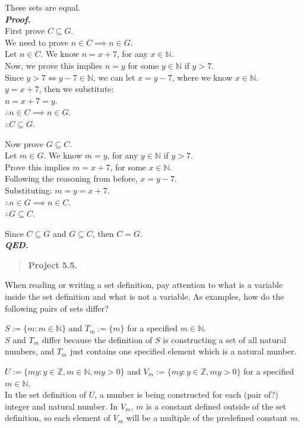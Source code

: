 These sets are equal.\\
\textbf{\emph{Proof.}}\\
First prove \(C\subseteq G\).\\
We need to prove \(n\in C \implies n\in G\).\\
Let \(n\in C\). We know \(n=x+7\), for any \(x\in\mathbb{N}\).\\
Now, we prove this implies \(n=y\) for some \(y\in\mathbb{N}\) if
\(y>7\).\\
Since \(y>7 \iff y-7\in \mathbb{N}\), we can let \(x=y-7\), where we
know \(x\in\mathbb{N}\).\\
\(y=x+7\), then we substitute:\\
\(n=x+7=y\).\\
\(\therefore n\in C \implies n\in G\).\\
\(\therefore C\subseteq G\).

Now prove \(G\subseteq C\).\\
Let \(m\in G\). We know \(m=y\), for any \(y\in\mathbb{N}\) if
\(y>7\).\\
Prove this implies \(m=x+7\), for some \(x\in\mathbb{N}\).\\
Following the reasoning from before, \(x=y-7\).\\
Substituting: \(m=y=x+7\).\\
\(\therefore n\in G \implies n\in C\).\\
\(\therefore G\subseteq C\).

Since \(C \subseteq G\) and \(G \subseteq C\), then \(C=G\).\\
\textbf{\emph{QED.}}

\begin{quote}
\textbf{Project 5.5.}
\end{quote}

When reading or writing a set definition, pay attention to what is a
variable inside the set definition and what is not a variable. As
examples, how do the following pairs of sets differ?

\(S := \{m : m \in \mathbb{N}\}\) and \(T_m := \{m\}\) for a specified
\(m \in \mathbb{N}\).\\
\(S\) and \(T_m\) differ because the definition of \(S\) is constructing
a set of all natural numbers, and \(T_m\) just contains one specified
element which is a natural number.

\(U := \{my : y \in \mathbb{Z}, m \in \mathbb{N}, my > 0\}\) and
\(V_m := \{my : y \in \mathbb{Z}, my > 0\}\) for a specified
\(m \in \mathbb{N}\).\\
In the set definition of \(U\), a number is being constructed for each
(pair of?) integer and natural number. In \(V_m\), \(m\) is a constant
defined outside of the set definition, so each element of \(V_m\) will
be a multiple of the predefined constant \(m\).

